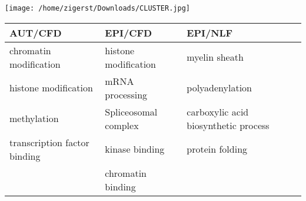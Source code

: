 \documentclass[landscape,twocolum,letterpaper]{article}
\newenvironment{Figure}
	{\par\medskip\noindent\minipage{\linewidth}}
		{\endminipage\par\medskip}
\begin{document}
\begin{multicols*}{3}
\begin{Figure}
	\texttt{[image: /home/zigerst/Downloads/CLUSTER.jpg]}
	\centering
\end{Figure}
\begin{tabular}{m{2cm}m{2cm}m{2.8cm}}
\toprule
AUT/CFD & EPI/CFD & EPI/NLF\\ \midrule
\rowcolor{Gray}
chromatin modification & histone modification & myelin sheath\\
histone modification & mRNA processing & polyadenylation\\
\rowcolor{Gray}
methylation & Spliceosomal complex & carboxylic acid biosynthetic process\\
transcription factor binding & kinase binding & protein folding\\
\rowcolor{Gray}
 & chromatin binding & \\
\hline
\end{tabular}
\fontsize{8}{8}\selectfont{Table 3. Functional enrichment for Autism and Epilepsy groups. Most groups showed minimal functional enrichment trends.}\\ \\
\fontsize{12}{12}\\
\fontsize{12}{12}\selectfont{Following these results, the genes of interest will be investigated for linked expression patterns in various brain samples.}\\
 

\end{multicols*}
\end{document}
